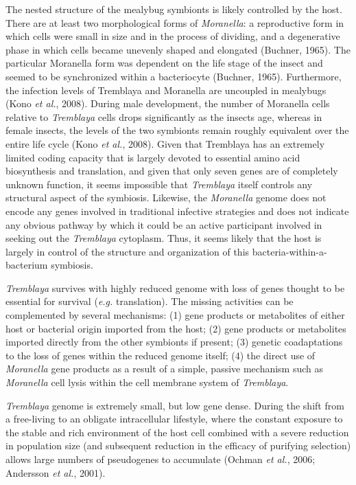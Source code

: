 \documentclass[11pt]{article}
\begin{document}
\begin{sloppypar}
\par
The nested structure of the mealybug symbionts is likely controlled by the host. 
There are at least two morphological forms of \textit{Moranella}: a reproductive form in which cells were small in size and in the process of dividing, and a degenerative phase in which cells became unevenly shaped and elongated (Buchner, 1965). 
The particular Moranella form was dependent on the life stage of the insect and seemed to be synchronized within a bacteriocyte (Buchner, 1965). 
Furthermore, the infection levels of Tremblaya and Moranella are uncoupled in mealybugs (Kono \textit{et al.}, 2008). 
During male development, the number of Moranella cells relative to \textit{Tremblaya} cells drops significantly as the insects age, whereas in female insects, the levels of the two symbionts remain roughly equivalent over the entire life cycle (Kono \textit{et al.}, 2008). 
Given that Tremblaya has an extremely limited coding capacity that is largely devoted to essential amino acid biosynthesis and translation, and given that only seven genes are of completely unknown function, it seems impossible that \textit{Tremblaya} itself controls any structural aspect of the symbiosis. 
Likewise, the \textit{Moranella} genome does not encode any genes involved in traditional infective strategies and does not indicate any obvious pathway by which it could be an active participant involved in seeking out the \textit{Tremblaya} cytoplasm. 
Thus, it seems likely that the host is largely in control of the structure and organization of this bacteria-within-a-bacterium symbiosis.
\par
\textit{Tremblaya} survives with highly reduced genome with loss of genes thought to be essential for survival (\textit{e.g.} translation). 
The missing activities can be complemented by several mechanisms: 
(1) gene products or metabolites of either host or bacterial origin imported from the host; 
(2) gene products or metabolites imported directly from the other symbionts if present; 
(3) genetic coadaptations to the loss of genes within the reduced genome itself; 
(4) the direct use of \textit{Moranella} gene products as a result of a simple, passive mechanism such as \textit{Moranella} cell lysis within the cell membrane system of \textit{Tremblaya}. 
\par
\textit{Tremblaya} genome is extremely small, but low gene dense. 
During the shift from a free-living to an obligate intracellular lifestyle, where the constant exposure to the stable and rich environment of the host cell combined with a severe reduction in population size (and subsequent reduction in the efficacy of purifying selection) allows large numbers of pseudogenes to accumulate (Ochman \textit{et al.}, 2006; Andersson \textit{et al.}, 2001). 

\end{sloppypar}
\end{document}
